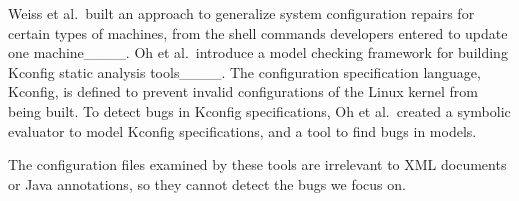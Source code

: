 Weiss et al.~built an approach to generalize system configuration repairs for certain types of machines, from the shell commands developers entered to update one machine____. 
Oh et al.~introduce a model checking framework for building Kconfig static analysis tools____. The configuration specification language, Kconfig, is defined to prevent invalid configurations of the Linux kernel from being built. %
To detect bugs in Kconfig specifications, Oh et al.~created a symbolic evaluator  to model Kconfig specifications, and a tool to find bugs in  models. 

The configuration files examined by these tools are irrelevant to XML documents or Java annotations, so they cannot detect the bugs we  focus on.